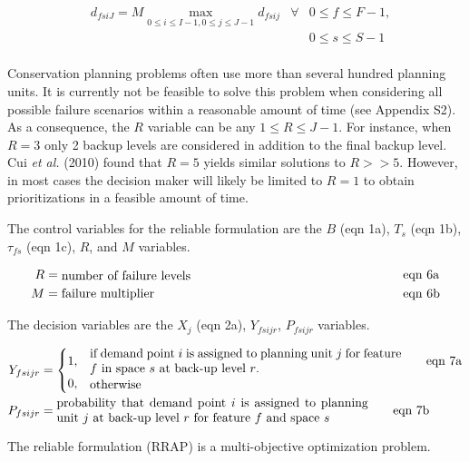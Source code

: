 \documentclass[11pt,]{article}
\begin{document}
\begin{align*}
& d_{fsiJ} = M \max\limits_{0 \leq i \leq I-1, 0 \leq j \leq J-1} d_{fsij} & \forall & 0 \leq f \leq F-1, \tag*{eqn 5} \\
& & & 0 \leq s \leq S-1\\
\end{align*}

Conservation planning problems often use more than several hundred
planning units. It is currently not be feasible to solve this problem
when considering all possible failure scenarios within a reasonable
amount of time (see Appendix S2). As a consequence, the \(R\) variable
can be any \(1 \leq R \leq J-1\). For instance, when \(R=3\) only 2
backup levels are considered in addition to the final backup level. Cui
\emph{et al.} (2010) found that \(R=5\) yields similar solutions to
\(R >> 5\). However, in most cases the decision maker will likely be
limited to \(R=1\) to obtain prioritizations in a feasible amount of
time.

The control variables for the reliable formulation are the \(B\) (eqn
1a), \(T_{s}\) (eqn 1b), \(\tau_{fs}\) (eqn 1c), \(R\), and \(M\)
variables.

\begin{align*}
R &= \parbox{25em}{number of failure levels} \tag*{eqn 6a} \\
%
M &= \parbox{25em}{failure multiplier} \tag*{eqn 6b}\\
%
\end{align*}

The decision variables are the \(X_j\) (eqn 2a), \(Y_{fsijr}\),
\(P_{fsijr}\) variables.

\begin{align*}
Y_{fsijr} &= \begin{cases}
    1, & \parbox{25em}{if demand point $i$ is assigned to planning unit $j$ for feature $f$ in space $s$ at back-up level $r$. } \tag*{eqn 7a} \\
    0, & \parbox{25em}{otherwise} \\
  \end{cases} \\
%
P_{fsijr} &= \parbox{25em}{probability that demand point $i$ is assigned to planning unit $j$ at back-up level $r$ for feature $f$ and space $s$} \tag*{eqn 7b}\\
%
\end{align*}

The reliable formulation (RRAP) is a multi-objective optimization
problem.
\end{document}
